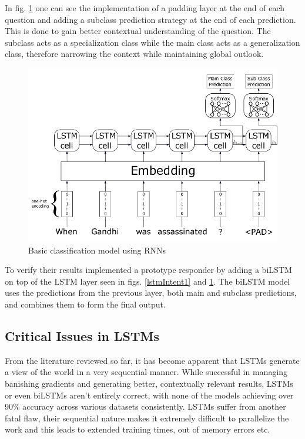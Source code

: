\documentclass[a4paper,12pt]{report}
\begin{document}
		In fig. \ref{lstmIntent2} one can see the implementation of a padding layer at the end of each question and adding a subclass prediction strategy at the end of each prediction. This is done to gain better contextual understanding of the question. The subclass acts as a specialization class while the main class acts as a generalization class, therefore narrowing the context while maintaining global outlook.
		\begin{figure}[!h]
			\centering
			\includegraphics[scale=0.35]{../images/lstm-intent2.png}
			\caption{Basic classification model using RNNs \citep{lstmintent}}\label{lstmIntent2}
		\end{figure}
		To verify their results \citep{lstmintent} implemented a prototype responder by adding a biLSTM on top of the LSTM layer seen in figs. \ref{lstmIntent1} and \ref{lstmIntent2}.  The biLSTM model uses the predictions from the previous layer, both main and subclass predictions, and combines them to form the final output.

		\subsection{Critical Issues in LSTMs}\label{c2criticalissues}

		From the literature reviewed so far, it has become apparent that LSTMs generate a view of the world in a very sequential manner. While successful in managing banishing gradients and generating better, contextually relevant results, LSTMs or even biLSTMs aren't entirely correct, with none of the models achieving over 90\% accuracy across various datasets consistently. LSTMs suffer from another fatal flaw, their sequential nature makes it extremely difficult to parallelize the work and this leads to extended training times, out of memory errors etc.
\end{document}
